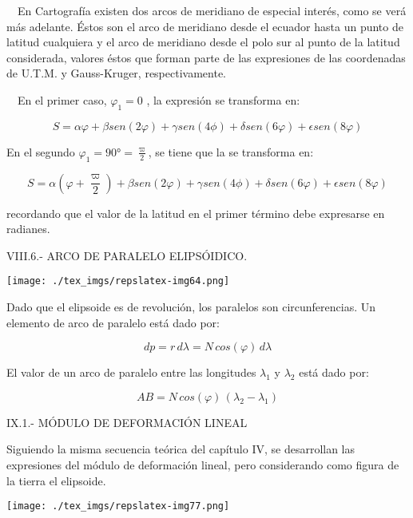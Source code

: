 \documentclass{tufte-book}
\begin{document}
\ \ En Cartografía existen dos arcos de meridiano de especial
interés, como se verá más adelante. Éstos son el arco de
meridiano desde el ecuador hasta un punto de latitud cualquiera y el
arco de meridiano desde el polo sur al punto de la latitud considerada,
valores éstos que forman parte de las expresiones de las coordenadas
de U.T.M. y Gauss-Kruger, respectivamente. 

\ \ En el primer caso, \(\varphi_1=0\) , la expresión %
se transforma en:

 \begin{equation*}
S=\alpha \varphi + \beta sen (2\varphi) + \gamma sen (4\phi) + \delta sen (6\varphi) + \epsilon sen (8\varphi)
\end{equation*}

 En el segundo \(\varphi_1=90°=\frac{\varpi}{2}\), se tiene que la %
 se transforma en:

 \begin{equation*}
S=\alpha \left( \varphi + \frac{\varpi}{2} \right) + \beta sen (2\varphi) + \gamma sen (4\phi) + \delta sen (6\varphi) + \epsilon sen (8\varphi)
\end{equation*}

recordando que el valor de la latitud en el primer término debe
expresarse en radianes.

VIII.6.- ARCO DE PARALELO ELIPSÓIDICO.

\begin{marginfigure}
\texttt{[image: ./tex\_imgs/repslatex-img64.png]}
\end{marginfigure}
 

Dado que el elipsoide es de revolución, los paralelos son
circunferencias. Un elemento de arco de paralelo está dado por:

\[
dp=r\,d\lambda=N\,cos(\varphi)\,d\lambda
\]

El valor de un arco de paralelo entre las longitudes \(\lambda_1\)
  y \(\lambda_2\) está dado por:

  \[
  AB=N\,cos(\varphi)\,(\lambda_2-\lambda_1)
  \]

IX.1.- MÓDULO DE DEFORMACIÓN LINEAL

Siguiendo la misma secuencia teórica del capítulo IV, se desarrollan
las expresiones del módulo de deformación lineal, pero considerando
como figura de la tierra el elipsoide.

\begin{marginfigure}
\texttt{[image: ./tex\_imgs/repslatex-img77.png]}
\end{marginfigure}
 
\end{document}
